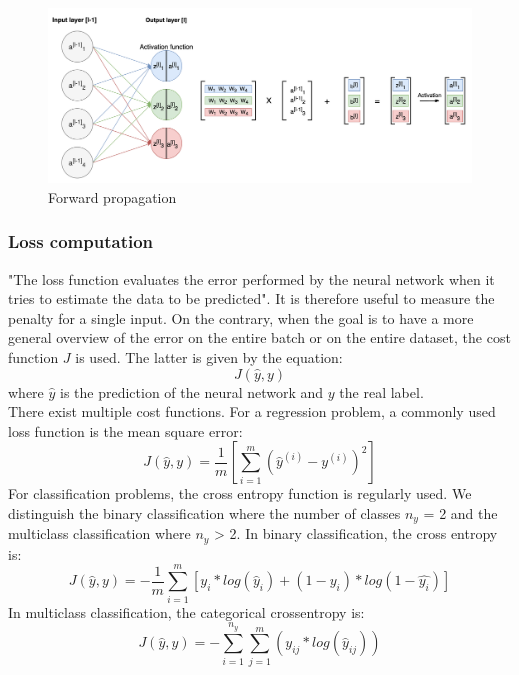 \begin{figure}[!h]
\centering
\includegraphics[width=1\textwidth, keepaspectratio=true]{./figures/forward_propagation.png}
\caption{Forward propagation }
\label{forward_propagation}
\end{figure}

\subsubsection{Loss computation}
"The loss function evaluates the error performed by the neural network when it tries
to estimate the data to be predicted"\cite{18}. It is therefore useful to measure the penalty for a single input. On the contrary, when the goal is to have a more general overview of the error on the entire batch or on the entire dataset, the cost function $J$ is used. The latter is given by the equation:
\begin{equation}
J(\hat{y}, y)
\end{equation}
where $\hat{y}$ is the prediction of the neural network and $y$ the real label.\\
There exist multiple cost functions. For a regression problem, a commonly used loss function is the mean square error:
\begin{equation}
J(\hat{y}, y) = \frac{1}{m}[\sum_{i=1}^{m} (\hat{y}^{(i)} - y^{(i)})^{2}]
\end{equation}
For classification problems, the cross entropy function is regularly used. We distinguish the binary classification where the number of classes $n_{y}$ = 2 and the multiclass classification where $n_{y}$ > 2. In binary classification, the cross entropy is:
\begin{equation}
J(\hat{y}, y) = -\frac{1}{m}\sum_{i=1}^{m} [y_{i}*log(\hat{y}_{i}) + (1-y_{i})*log(1-\hat{y_i})]
\end{equation}
In multiclass classification, the categorical crossentropy is:
\begin{equation}
J(\hat{y}, y) = - \sum_{i=1}^{n_{y}} \sum_{j=1}^{m} (y_{ij}*log(\hat{y}_{ij}))
\end{equation}

